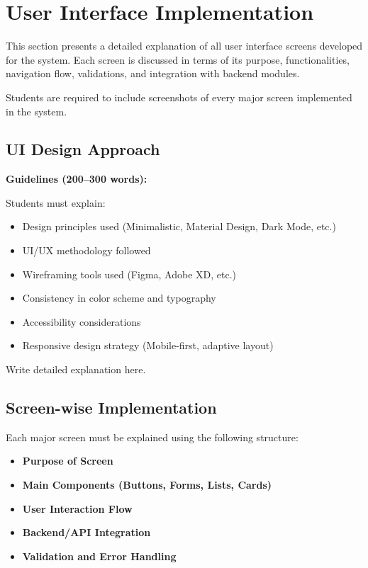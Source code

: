 \section{User Interface Implementation}

This section presents a detailed explanation of all user interface screens 
developed for the system. Each screen is discussed in terms of its purpose, 
functionalities, navigation flow, validations, and integration with backend modules.

Students are required to include screenshots of every major screen 
implemented in the system.


\subsection{UI Design Approach}

\textbf{Guidelines (200–300 words):}

Students must explain:

\begin{itemize}
    \item Design principles used (Minimalistic, Material Design, Dark Mode, etc.)
    \item UI/UX methodology followed
    \item Wireframing tools used (Figma, Adobe XD, etc.)
    \item Consistency in color scheme and typography
    \item Accessibility considerations
    \item Responsive design strategy (Mobile-first, adaptive layout)
\end{itemize}

Write detailed explanation here.


\subsection{Screen-wise Implementation}

Each major screen must be explained using the following structure:

\begin{itemize}
    \item \textbf{Purpose of Screen}
    \item \textbf{Main Components (Buttons, Forms, Lists, Cards)}
    \item \textbf{User Interaction Flow}
    \item \textbf{Backend/API Integration}
    \item \textbf{Validation and Error Handling}
\end{itemize}


